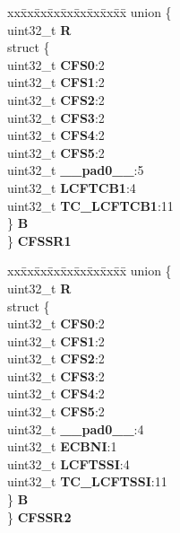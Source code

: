 \begin{DoxyCompactItemize}
\begin{tabbing}
\end{tabbing}\item 
\mbox{\label{structEQADC__tag_abf1b93f37df75da4b62cde174992e3ba}} 
\begin{tabbing}
xx\=xx\=xx\=xx\=xx\=xx\=xx\=xx\=xx\=\kill
union \{\\
\>uint32\_t {\bfseries R}\\
\>struct \{\\
\>\>uint32\_t {\bfseries CFS0}:2\\
\>\>uint32\_t {\bfseries CFS1}:2\\
\>\>uint32\_t {\bfseries CFS2}:2\\
\>\>uint32\_t {\bfseries CFS3}:2\\
\>\>uint32\_t {\bfseries CFS4}:2\\
\>\>uint32\_t {\bfseries CFS5}:2\\
\>\>uint32\_t {\bfseries \_\_pad0\_\_}:5\\
\>\>uint32\_t {\bfseries LCFTCB1}:4\\
\>\>uint32\_t {\bfseries TC\_LCFTCB1}:11\\
\>\} {\bfseries B}\\
\} {\bfseries CFSSR1}\\

\end{tabbing}\item 
\mbox{\label{structEQADC__tag_a5a4901b18675a220524325c56a631e09}} 
\begin{tabbing}
xx\=xx\=xx\=xx\=xx\=xx\=xx\=xx\=xx\=\kill
union \{\\
\>uint32\_t {\bfseries R}\\
\>struct \{\\
\>\>uint32\_t {\bfseries CFS0}:2\\
\>\>uint32\_t {\bfseries CFS1}:2\\
\>\>uint32\_t {\bfseries CFS2}:2\\
\>\>uint32\_t {\bfseries CFS3}:2\\
\>\>uint32\_t {\bfseries CFS4}:2\\
\>\>uint32\_t {\bfseries CFS5}:2\\
\>\>uint32\_t {\bfseries \_\_pad0\_\_}:4\\
\>\>uint32\_t {\bfseries ECBNI}:1\\
\>\>uint32\_t {\bfseries LCFTSSI}:4\\
\>\>uint32\_t {\bfseries TC\_LCFTSSI}:11\\
\>\} {\bfseries B}\\
\} {\bfseries CFSSR2}\\


\end{tabbing}
\end{DoxyCompactItemize}

